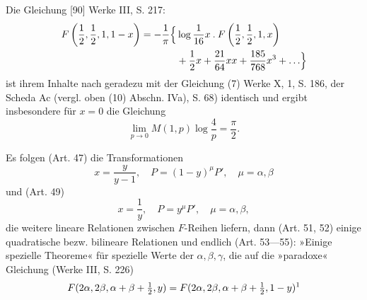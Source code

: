 Die Gleichung [90] Werke III, S. 217:
\[
\begin{aligned}
F\left(\frac12,\frac12,1,1-x\right)
=-\frac1\pi\Bigl\{&\log\frac1{16}x\mathbin{.}F\left(\frac12,\frac12,1,x\right)\\
&+\frac12x+\frac{21}{64}xx+\frac{185}{768}x^3+\ldots\Bigr\}
\end{aligned}
\]
ist ihrem Inhalte nach geradezu mit der Gleichung (7) Werke X, 1, S. 186,
der Scheda Ac (vergl. oben (10) Abschn. IVa), S. 68) identisch und ergibt
insbesondere für \(x=0\) die Gleichung
\[
\lim_{p\to0}M(1,p)\log\frac4p=\frac\pi2.
\]
\par
Es folgen (Art. 47) die Transformationen
\[
x=\frac{y}{y-1},\quad P=(1-y)^\mu P',\quad \mu=\alpha,\beta
\]
und (Art. 49)
\[
x=\frac1y,\quad P=y^\mu P',\quad \mu=\alpha,\beta,
\]
die weitere lineare Relationen zwischen \(F\)-Reihen liefern, dann (Art. 51, 52)
einige quadratische bezw. bilineare Relationen und endlich (Art. 53—55):
»Einige spezielle Theoreme« für spezielle Werte der \(\alpha,\beta,\gamma\), die auf die »paradoxe«
Gleichung (Werke III, S. 226)
\begingroup\renewcommand{\thefootnote}{216a)}
\[
F(2\alpha,2\beta,\alpha+\beta+\tfrac12,y)
=F(2\alpha,2\beta,\alpha+\beta+\tfrac12,1-y)\text{\footnotemark}
\]
